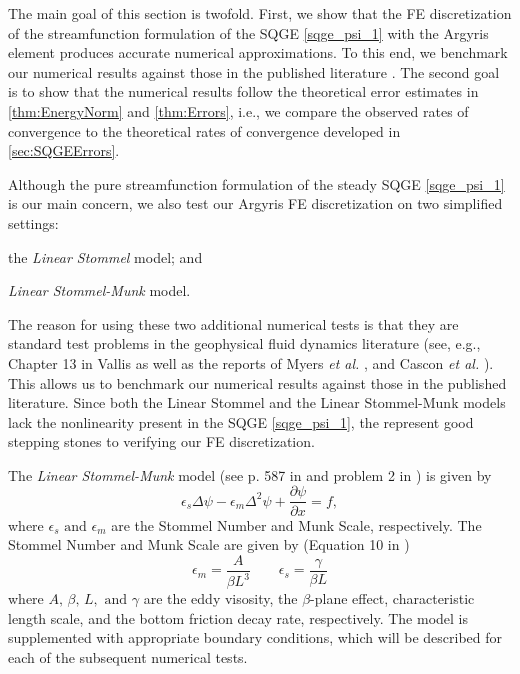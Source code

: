 The main goal of this section is twofold. First, we show that the FE
discretization of the streamfunction formulation of the SQGE \eqref{sqge_psi_1}
with the Argyris element produces accurate numerical approximations. To this
end, we benchmark our numerical results against those in the published
literature \cite{Vallis06, Cascon, Myers}. The second goal is to show that the
numerical results follow the theoretical error estimates in
\autoref{thm:EnergyNorm} and \autoref{thm:Errors}, i.e., we compare the observed
rates of convergence to the theoretical rates of convergence developed in
\autoref{sec:SQGEErrors}.

Although the pure streamfunction formulation of the steady SQGE
\eqref{sqge_psi_1} is our main concern, we also test our Argyris FE
discretization on two simplified settings: \begin{inparaenum}[(i)] \item the
\emph{Linear Stommel} model; and \item \emph{Linear Stommel-Munk} model.
\end{inparaenum} The reason for using these two additional numerical tests is
that they are standard test problems in the geophysical fluid dynamics
literature (see, e.g., Chapter 13 in Vallis \cite{Vallis06} as well as the
reports of Myers \emph{et al.} \cite{Myers}, and Cascon \emph{et al.}
\cite{Cascon}). This allows us to benchmark our numerical results against
those in the published literature. Since both the Linear Stommel and the
Linear Stommel-Munk models lack the nonlinearity present in the SQGE
\eqref{sqge_psi_1}, the represent good stepping stones to verifying our FE
discretization.

The \emph{Linear Stommel-Munk} model (see p. 587 in \cite{Vallis06} and problem
2 in \cite{Cascon}) is given by
\begin{equation}
  \epsilon_s \Delta \psi - \epsilon_m \Delta^2 \psi + \frac{\partial \psi}{\partial x} = f,
  \label{eqn:Stommel-Munk}
\end{equation}
where $\epsilon_s \text{ and } \epsilon_m$ are the Stommel Number and Munk
Scale, respectively. The Stommel Number and Munk Scale are given by (Equation 10
in \cite{Myers})
\begin{equation*}
  \epsilon_m = \frac{A}{\beta L^3} \qquad \epsilon_s = \frac{\gamma}{\beta L}
\end{equation*}
where $A,\, \beta,\, L, \text{ and } \gamma$ are the eddy visosity, the
$\beta$-plane effect, characteristic length scale, and the bottom friction decay
rate, respectively. The model is supplemented with appropriate boundary
conditions, which will be described for each of the subsequent numerical tests.

